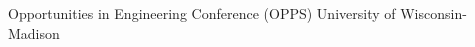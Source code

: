 \begin{cventries}
  \cventry
    {Opportunities in Engineering Conference (OPPS)}
    {University of Wisconsin-Madison}
    {}
    {}
    {}

\end{cventries}
